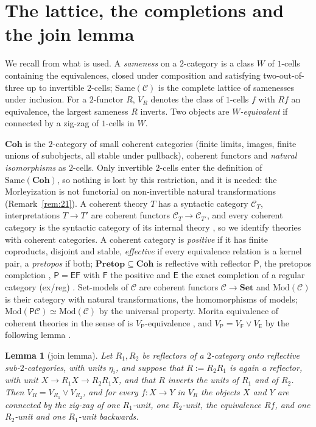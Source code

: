 \documentclass[11pt]{amsart}
\newtheorem{lem}[thm]{Lemma}
\theoremstyle{definition}
\newcommand{\Same}{\mathrm{Same}}
\newcommand{\Coh}{\mathbf{Coh}}
\newcommand{\Pretop}{\mathbf{Pretop}}
\newcommand{\Mod}{\mathrm{Mod}}
\newcommand{\Set}{\mathbf{Set}}
\newcommand{\FF}{\mathsf F}
\newcommand{\EE}{\mathsf E}
\newcommand{\PP}{\mathsf P}
\newcommand{\cC}{\mathcal C}
\begin{document}
\section{The lattice, the completions and the join lemma}\label{sec:prelim}

We recall from \cite{Same,TheoryComp} what is used. A \emph{sameness} on
a $2$-category is a class $W$ of $1$-cells containing the equivalences,
closed under composition and satisfying two-out-of-three up to
invertible $2$-cells; $\Same(\cC)$ is the complete lattice of samenesses
under inclusion. For a $2$-functor $R$, $V_R$ denotes the class of
$1$-cells $f$ with $Rf$ an equivalence, the largest sameness $R$ inverts.
Two objects are \emph{$W$-equivalent} if connected by a zig-zag of
$1$-cells in $W$.

$\Coh$ is the $2$-category of small coherent categories (finite limits,
images, finite unions of subobjects, all stable under pullback),
coherent functors \cite[A1.4]{Elephant} and \emph{natural isomorphisms}
as $2$-cells. Only invertible $2$-cells enter the definition of
$\Same(\Coh)$, so nothing is lost by this restriction, and it is needed:
the Morleyization is not functorial on non-invertible natural
transformations (Remark~\ref{rem:21}). A coherent theory $T$ has a
syntactic category $\cC_T$, interpretations $T\to T'$ are coherent
functors $\cC_T\to\cC_{T'}$, and every coherent category is the
syntactic category of its internal theory \cite[D1.4]{Elephant}, so we
identify theories with coherent categories. A coherent category is
\emph{positive} if it has finite coproducts, disjoint and stable,
\emph{effective} if every equivalence relation is a kernel pair, a
\emph{pretopos} if both; $\Pretop\subseteq\Coh$ is reflective with
reflector $\PP$, the pretopos completion \cite[A3.3]{Elephant},
$\PP=\EE\FF$ with $\FF$ the positive and $\EE$ the exact completion of
a regular category (ex/reg)
\cite{CV98,LV01}. Set-models of $\cC$ are coherent functors
$\cC\to\Set$ and $\Mod(\cC)$ is their category with natural
transformations, the homomorphisms of models; $\Mod(\PP\cC)\simeq
\Mod(\cC)$ by the universal property. Morita equivalence of coherent
theories in the sense of \cite{BH16,Tsem17} is $V_\PP$-equivalence
\cite[Thm.~4.7, Cor.~4.9]{Tsem17}, and $V_\PP=V_\FF\vee V_\EE$ by the following
lemma \cite[Lemma~2.3, Thm.~4.1]{TheoryComp}.

\begin{lem}[join lemma]\label{lem:join}
Let $R_1,R_2$ be reflectors of a $2$-category onto reflective
sub-$2$-categories, with units $\eta_i$, and suppose that $R:=R_2R_1$ is
again a reflector, with unit $X\to R_1X\to R_2R_1X$, and that $R$
inverts the units of $R_1$ and of $R_2$. Then $V_R=V_{R_1}\vee V_{R_2}$,
and for every $f\colon X\to Y$ in $V_R$ the objects $X$ and $Y$ are
connected by the zig-zag of one $R_1$-unit, one $R_2$-unit, the
equivalence $Rf$, and one $R_2$-unit and one $R_1$-unit backwards.
\end{lem}
\end{document}
